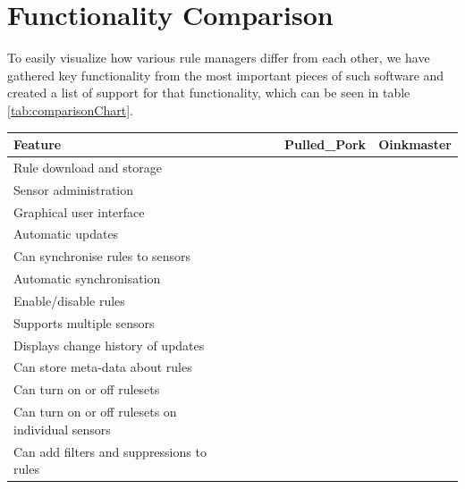 \section{Functionality Comparison}
\label{sec:functionality_comparison}
To easily visualize how various rule managers differ from each other, we
have gathered key functionality from the most important pieces of such software
and created a list of support for that functionality, which can be seen in table
\ref{tab:comparisonChart}.

\newpage
\renewcommand{\arraystretch}{1.5}
\begingroup
\setlength{\LTleft}{-20cm plus -1fill}
\setlength{\LTright}{\LTleft}
\begin{longtable}{m|m|m|m|m|m}
	Feature & \snowman{} & \bhtb{} & \snortmanager{} & Pulled\_Pork & Oinkmaster \\
	\hline
	\multicolumn{1}{p{5cm}|}{Rule download and storage} & \checkmark &
	\checkmark & \checkmark & \checkmark & \checkmark \\
	\multicolumn{1}{p{5cm}|}{Sensor administration} & \checkmark & \checkmark &
	\checkmark & &
	\\
	\multicolumn{1}{p{5cm}|}{Graphical user interface} & \checkmark & \checkmark
	& \checkmark & &
	\\
	\multicolumn{1}{p{5cm}|}{Automatic updates} & \checkmark &
	\checkmark &  & \checkmark & \checkmark \\
	\multicolumn{1}{p{5cm}|}{Can synchronise rules to sensors} & \checkmark &
	\checkmark & & & \checkmark \\	
	\multicolumn{1}{p{5cm}|}{Automatic synchronisation} & \checkmark &
	\checkmark &  &  & \checkmark \\
	\multicolumn{1}{p{5cm}|}{Enable/disable rules} & \checkmark & \checkmark & 
	& & \checkmark \\
	\multicolumn{1}{p{5cm}|}{Supports multiple sensors} & \checkmark &
	\checkmark & & & \checkmark \\
	\multicolumn{1}{p{5cm}|}{Displays change history of updates} & \checkmark &
	\checkmark & & & \checkmark \\
	\multicolumn{1}{p{5cm}|}{Can store meta-data about rules} & \checkmark &
	\checkmark & & & \\
	\multicolumn{1}{p{5cm}|}{Can turn on or off rulesets} & \checkmark & \checkmark &  & & \\
	\multicolumn{1}{p{5cm}|}{Can turn on or off rulesets on individual sensors} & \checkmark & \checkmark & & & \\
	\multicolumn{1}{p{5cm}|}{Can add filters and suppressions to rules} & \checkmark & \checkmark &  & & \\

\end{longtable}
